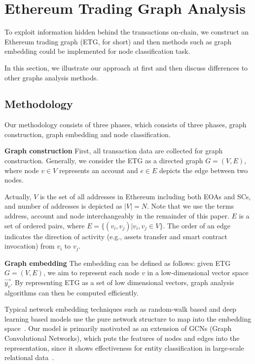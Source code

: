 
\section{Ethereum Trading Graph Analysis}
To exploit information hidden behind the transactions on-chain, we construct an Ethereum trading graph (ETG, for short) and then  methods such as graph embedding could be implemented for node classification task.

In this section, we illustrate our approach at first and then discuss differences to other graphs analysis methods.

\subsection{Methodology}
\label{subsec:methodology}
Our methodology consists of three phases, which consists of three phases, graph construction, graph embedding and node classification. 

\textbf{Graph construction}
First, all transaction data are collected for graph construction. Generally, we consider the ETG as a directed graph $G=(V,E)$, where node $v \in V$ represents an account and $e \in E$ depicts the edge between two nodes. 

Actually, $V$ is the set of all addresses in Ethereum including both EOAs and SCs, and number of addresses is depicted as $|V|=N$. Note that we use the terms address, account and node interchangeably in the remainder of this paper. $E$ is a set of ordered pairs, where $E=\{(v_i,v_j)|v_i,v_j \in V\}$. The order of an edge indicates the direction of activity (e.g., assets transfer and smart contract invocation) from $v_i$ to $v_j$. %



\textbf{Graph embedding}
The embedding can be defined as follows: given ETG $G=(V,E)$, we aim to represent each node $v$ in a low-dimensional vector space $\vec{y_v}$. By representing ETG as a set of low dimensional vectors, graph analysis algorithms can then be computed efficiently. 

Typical network embedding techniques such as random-walk based and deep learning based models use the pure network structure to map into the embedding space~\cite{goyal2018capturing}. Our model is primarily motivated as an extension of GCNs (Graph Convolutional Networks), which puts the features of nodes and edges into the representation, since it shows effectiveness for entity classification in large-scale relational data~\cite{kipf2016semi}.

